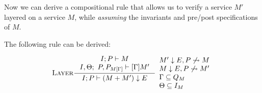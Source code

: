 

Now we can derive a compositional rule that allows us to verify a
service $M'$ layered on a service $M$, while \emph{assuming} the
invariants and pre/post specifications of $M$.

\begin{theorem}
The following rule can be derived:
\begin{small}
\[\irule{Layer}\inference{ I;P \vdash M  \\
              I,\Theta;\ P, P_{\PostAssume{M}{\Gamma}} \vdash \PreAssume{M'}{\Gamma}}
            { I;P \vdash (M \Comp M') \Restr E }
            {\begin{array}{l}
              M' \Restr E,P \not \Interf M\\
              M\Restr E,P \not \Interf M'\\
              \Gamma \subseteq \modinvar_M\\
              \Theta \subseteq I_M
            \end{array}}
 \]
\end{small}
\end{theorem}


